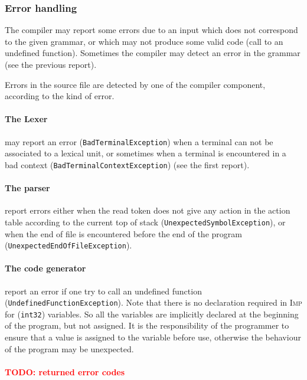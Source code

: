 \documentclass[11pt]{article}
\newcommand\todo[1]{\textcolor{red}{TODO: #1}}
\newcommand\imp{\textsc{Imp}\xspace}
\newcommand\inttt{\texttt{int32}\xspace}
\begin{document}
\subsubsection{Error handling}

The compiler may report some errors due to an input which does not correspond to the given grammar, or which may not
produce some valid code (call to an undefined function).
Sometimes the compiler may detect an error in the grammar (see the previous report).

Errors in the source file are detected by one of the compiler component, according to the kind of error.

\paragraph*{The Lexer} may report an error (\texttt{BadTerminalException}) when a terminal can not be associated to a
lexical unit, or sometimes when a terminal is encountered in a bad context (\texttt{BadTerminalContextException}) (see
the first report).

\paragraph*{The parser} report errors either when the read token does not give any action in the action table
according to the current top of stack (\texttt{UnexpectedSymbolException}),
or when the end of file is encountered before the end of the program (\texttt{UnexpectedEndOfFileException}).

\paragraph*{The code generator} report an error if one try to call an undefined function
(\texttt{UndefinedFunctionException}).
Note that there is no declaration required in \imp for (\inttt) variables.
So all the variables are implicitly declared at the beginning of the program, but not assigned.
It is the responsibility of the programmer to ensure that a value is assigned to the variable before use,
otherwise the behaviour of the program may be unexpected.

\paragraph*{\todo{returned error codes}}
\end{document}
